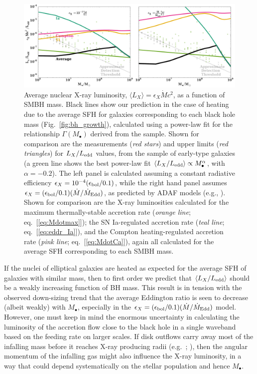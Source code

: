 \documentclass[usenatbib,fleqn]{mn2e}
\newcommand{\Mdot}{\dot{M}}
\newcommand{\MdotEdd}{\dot{M}_{\rm Edd}}
\begin{document}
\begin{figure}
\includegraphics[width=\textwidth]{miller.pdf}
\caption{\label{fig:miller} Average nuclear X-ray luminosity, $\langle
  L_X \rangle = \epsilon_X \Mdot c^2$, as a function of SMBH mass.
  Black lines show our prediction in the case of heating due to the
  average SFH for galaxies corresponding to each
  black hole mass (Fig.~\ref{fig:bh_growth}), calculated using a
  power-law fit for the relationship $\Gamma(M_{\bullet})$ derived
  from the \citet{LauerFaber+:2007a} sample.  Shown for comparison are
  the measurements ({\it red stars}) and upper limits ({\it red
    triangles}) for $L_X/L_{\rm edd}$ values, from the
  \citet{Miller+15} sample of early-type galaxies (a green line shows
  the best power-law fit $\langle L_X/L_{\rm edd}\rangle \propto
  M_{\bullet}^{\alpha}$, with $\alpha = -0.2$).  The left panel is
  calculated assuming a constant radiative efficiency
  $\epsilon_X=10^{-4} (\epsilon_{\rm bol}/0.1)$, while the right hand
  panel assumes $\epsilon_X= (\epsilon_{\rm
    bol}/0.1)(\Mdot/\MdotEdd)$, as predicted by ADAF models (e.g.,
  \citealt{Narayan&Yi95}).  Shown for comparison are the X-ray
  luminosities calculated for the maximum thermally-stable accretion
  rate ({\it orange line}; eq.~[\ref{eq:Mdotmax}]); the SN
  Ia-regulated accretion rate ({\it teal line};
  eq.~[\ref{eq:eddr_Ia}]), and the Compton heating-regulated accretion
  rate ({\it pink line}; eq.~[\ref{eq:MdotCa}]), again all calculated
  for the average SFH corresponding to each SMBH
  mass.}
\end{figure}

If the nuclei of elliptical galaxies are heated as expected for the average SFH of galaxies with
similar mass, then to first order we predict that $\langle
L_{X}/L_{\rm edd}\rangle$ should be a weakly increasing function of BH mass.
This result is in tension with the observed down-sizing trend that the average Eddington ratio is seen to
decrease (albeit weakly) with $M_{\bullet}$, especially in the $\epsilon_X= (\epsilon_{\rm
  bol}/0.1)(\Mdot/\MdotEdd)$ model.  However, one must keep in mind the enormous uncertainty in calculating the luminosity of the accretion flow close to the black hole in a single waveband based on the feeding rate on larger scales.  If disk outflows carry away most of the infalling mass before it reaches X-ray producing radii (e.g.~\citealt{Blandford&Begelman99}; \citealt{Li+13}), then the angular momentum of the infalling gas might also influence the X-ray luminosity, in a way that could depend systematically on the stellar population and hence $M_{\bullet}$.
\end{document}
